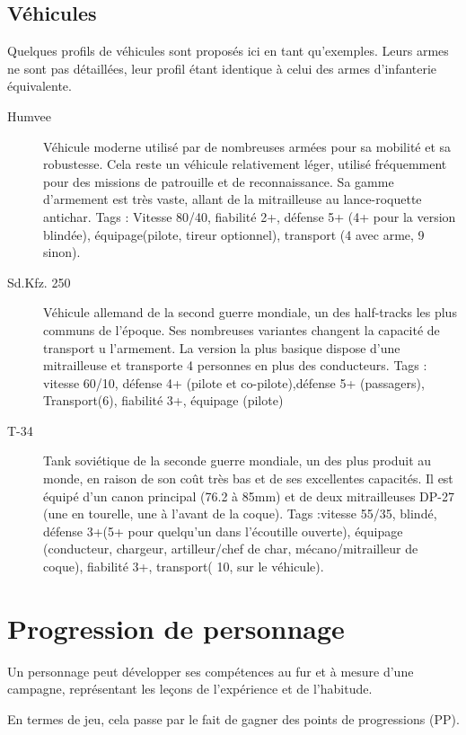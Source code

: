 \documentclass{report}
\begin{document}
\begin{multicols}{2}
\begin{description}
\subsection{Véhicules}
Quelques profils de véhicules sont proposés ici en tant qu'exemples. Leurs armes ne sont pas détaillées, leur profil étant identique à celui des armes d'infanterie équivalente.
\begin{description}
\item[Humvee]Véhicule moderne utilisé par de nombreuses armées pour sa mobilité et sa robustesse. Cela reste un véhicule relativement léger, utilisé fréquemment pour des missions de patrouille et de reconnaissance. Sa gamme d'armement est très vaste, allant de la mitrailleuse au lance-roquette antichar. Tags : Vitesse 80/40, fiabilité 2+, défense 5+ (4+ pour la version blindée), équipage(pilote, tireur optionnel), transport (4 avec arme, 9 sinon).
\item[Sd.Kfz. 250] Véhicule allemand de la second guerre mondiale, un des half-tracks les plus communs de l'époque. Ses nombreuses variantes changent la capacité de transport u l'armement. La version la plus basique dispose d'une mitrailleuse et transporte 4 personnes en plus des conducteurs. Tags : vitesse 60/10, défense 4+ (pilote et co-pilote),défense 5+ (passagers), Transport(6), fiabilité 3+, équipage (pilote)
\item[T-34] Tank soviétique de la seconde guerre mondiale, un des plus produit au monde, en raison de son coût très bas et de ses excellentes capacités. Il est équipé d'un canon principal (76.2 à 85mm) et de deux mitrailleuses DP-27 (une en tourelle, une à l'avant de la coque). Tags :vitesse 55/35, blindé, défense 3+(5+ pour quelqu'un dans l'écoutille ouverte), équipage (conducteur, chargeur, artilleur/chef de char, mécano/mitrailleur de coque), fiabilité 3+, transport( 10, sur le véhicule).

\end{description}
\end{description}

\section{Progression de personnage}
Un personnage peut développer ses compétences au fur et à mesure d'une campagne, représentant les leçons de l'expérience et de l'habitude.

En termes de jeu, cela passe par le fait de gagner des points de progressions (PP).


\end{multicols}
\end{document}
